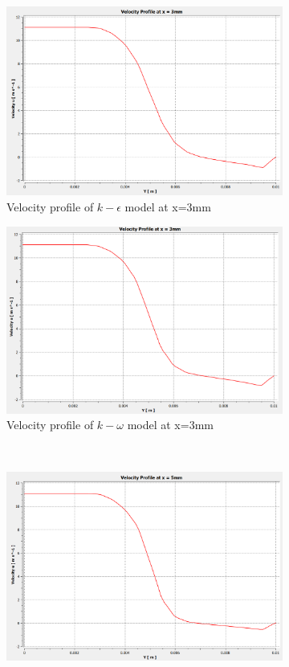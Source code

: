 \begin{figure}[H]
    \centering
    \begin{subfigure}{.48\textwidth}
    \centering
    \includegraphics[width=.95\linewidth]{images/task2/task2-1/cs1.png}
    \caption{Velocity profile of $k-\epsilon$ model at x=3mm}
    \end{subfigure}
\hfill
\begin{subfigure}{.48\textwidth}
    \centering
    \includegraphics[width=.95\linewidth]{images/task2/task2-2/cs1.png}
    \caption{Velocity profile of $k-\omega$ model at x=3mm}
\end{subfigure}
    ~
    \begin{subfigure}{.48\textwidth}
    \centering
    \includegraphics[width=.95\linewidth]{images/task2/task2-1/cs2.png}

\end{subfigure}
\end{figure}
